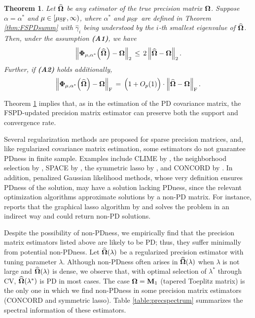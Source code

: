 \documentclass[times,sort&compress,3p]{elsarticle}
\newtheorem{theorem}{Theorem}
\begin{document}
%
\begin{theorem}%
\label{thm:FSPDprec}
Let $\widehat{\bf \Omega}$ be any estimator of the true precision matrix ${\bf \Omega}$. 
Suppose $\alpha=\alpha^*$ and $\mu \in [\mu_{\rm SF}, \infty)$, 
where $\alpha^*$ and $\mu_{\rm SF}$ are defined in Theorem \ref{thm:FSPDsumm} with 
$\widehat{\gamma}_i$ being understood by the $i$-th smallest eigenvalue of $\widehat{\bf \Omega}$.  Then, under the assumption {\bf (A1)},
we have
\[
\left\| {\bf \Phi}_{\mu, \alpha^*}\Big(\widehat{\bf \Omega}\Big) - {\bf \Omega} \right\|_2 \,\leq\,
	2\left\| \widehat{\bf \Omega} - {\bf \Omega} \right\|_2.
\]
Further, if {\bf (A2)} holds additionally,
\[
\left\| {\bf \Phi}_{\mu, \alpha^*}\Big(\widehat{\bf \Omega}\Big) - {\bf \Omega} \right\|_{\rm F} \,=\,
	\Big( 1 + O_p(1) \Big) \cdot
	\left\| \widehat{\bf \Omega} - {\bf \Omega} \right\|_{\rm F}.
\]
\end{theorem}
Theorem \ref{thm:FSPDprec} implies that, as in the estimation of the PD covariance matrix, the FSPD-updated precision
matrix estimator can preserve both the support and convergence rate. 


Several regularization methods are proposed for sparse precision matrices, and, like regularized covariance matrix estimation,
 some estimators do not guarantee PDness in  finite sample. Examples include CLIME
 by \citet{Cai2011}, the neighborhood selection by \citet{Meinshausen2006}, SPACE by \citet{Peng2009}, the symmetric lasso
 by \citet{Friedman2010}, and CONCORD by \citet{Khare2015}. In addition, penalized Gaussian likelihood methods,
 whose very definition ensures PDness of the solution, may have a solution lacking PDness, since the relevant optimization
 algorithms approximate solutions by a non-PD matrix. For instance, \citet{Mazumder2012} reports that the graphical
 lasso algorithm by \citet{Friedman2008} and \citet{Witten2011} solves the problem in an indirect way and could return non-PD
 solutions.


Despite the possibility of non-PDness, we empirically find that the precision matrix estimators listed
above are likely to be PD; thus, they suffer minimally from potential non-PDness. Let $\widehat{\bf \Omega}(\lambda)$ be
 a regularized precision estimator with tuning parameter $\lambda$. Although non-PDness often arises in
 $\widehat{\bf \Omega}(\lambda)$ when $\lambda$ is not large and $\widehat{\bf \Omega}(\lambda)$ is dense,
 we observe that, with optimal selection of $\lambda^*$ through CV, $\widehat{\bf \Omega}(\lambda^*)$ is
 PD in most cases. The case ${\bf \Omega}={\bf M}_1$ (tapered Toeplitz matrix) is the only one in which we find non-PDness
 in some precision matrix estimators (CONCORD and symmetric lasso). Table \ref{table:precspectrum} summarizes the
 spectral information of these estimators.
\end{document}
